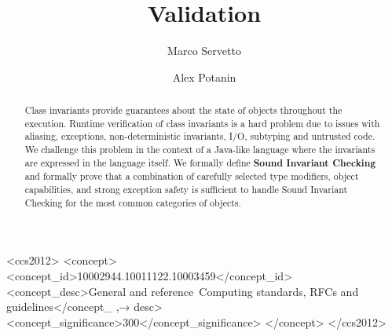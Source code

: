 \documentclass[english,submission]{programming}
\theoremstyle{plain}
\begin{document}
\title{Validation}
\author{Marco Servetto}
\author{Alex Potanin}

\begin{CCSXML}
<ccs2012>
<concept>
<concept_id>10002944.10011122.10003459</concept_id>
<concept_desc>General and reference~Computing standards, RFCs and guidelines</concept_
,→ desc>
<concept_significance>300</concept_significance>
</concept>
</ccs2012>
\end{CCSXML}
\maketitle
\begin{abstract}
Class invariants provide guarantees about the state of objects throughout the execution.
Runtime verification of class invariants is
a hard problem due to issues with aliasing, exceptions,
non-deterministic invariants, I/O, subtyping and untrusted code.
We challenge this problem in the context of
a Java-like language where the invariants are expressed in the language itself.
We formally define \textbf{Sound Invariant Checking}
and formally prove that a combination of carefully selected type modifiers, object capabilities,
 and strong exception safety is sufficient
to handle Sound Invariant Checking for the most common categories of objects.

\end{abstract}










%

\end{document}
